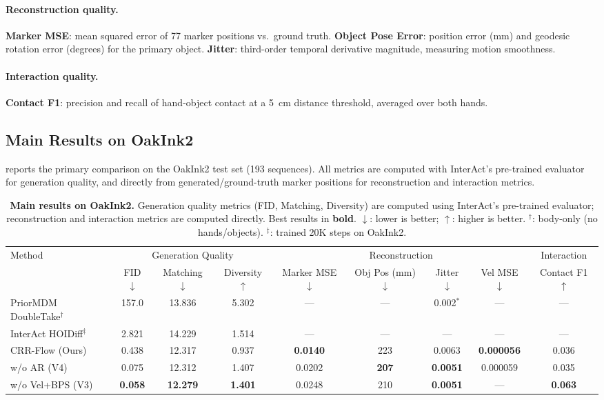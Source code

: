 \paragraph{Reconstruction quality.}
\textbf{Marker MSE}: mean squared error of 77 marker positions vs.\ ground truth.
\textbf{Object Pose Error}: position error (mm) and geodesic rotation error (degrees) for the primary object.
\textbf{Jitter}: third-order temporal derivative magnitude, measuring motion smoothness.

\paragraph{Interaction quality.}
\textbf{Contact F1}: precision and recall of hand-object contact at a 5~cm distance threshold, averaged over both hands.


\subsection{Main Results on OakInk2}
\label{sec:main_results}

 reports the primary comparison on the OakInk2 test set (193 sequences).
All metrics are computed with InterAct's pre-trained evaluator for generation quality, and directly from generated/ground-truth marker positions for reconstruction and interaction metrics.

\begin{table}[t]
  \caption{\textbf{Main results on OakInk2.} Generation quality metrics (FID, Matching, Diversity) are computed using InterAct's pre-trained evaluator; reconstruction and interaction metrics are computed directly. Best results in \textbf{bold}. $\downarrow$: lower is better; $\uparrow$: higher is better. $^\dagger$: body-only (no hands/objects). $^\ddagger$: trained 20K steps on OakInk2.}
  \label{tab:main_oakink2}
  \centering
  \small
  \begin{tabular}{@{}l|ccc|cccc|c@{}}
    \toprule
    \multirow{2}{*}{Method} & \multicolumn{3}{c|}{Generation Quality} & \multicolumn{4}{c|}{Reconstruction} & Interaction \\
    & FID $\downarrow$ & Matching $\downarrow$ & Diversity $\uparrow$ & Marker MSE $\downarrow$ & Obj Pos (mm) $\downarrow$ & Jitter $\downarrow$ & Vel MSE $\downarrow$ & Contact F1 $\uparrow$ \\
    \midrule
    PriorMDM DoubleTake$^\dagger$ & 157.0 & 13.836 & 5.302 & --- & --- & 0.002$^*$ & --- & --- \\
    InterAct HOIDiff$^\ddagger$ & 2.821 & 14.229 & 1.514 & --- & --- & --- & --- & --- \\
    \midrule
    CRR-Flow (Ours) & 0.438 & 12.317 & 0.937 & \textbf{0.0140} & 223 & 0.0063 & \textbf{0.000056} & 0.036 \\
    \quad w/o AR (V4) & 0.075 & 12.312 & 1.407 & 0.0202 & \textbf{207} & \textbf{0.0051} & 0.000059 & 0.035 \\
    \quad w/o Vel+BPS (V3) & \textbf{0.058} & \textbf{12.279} & \textbf{1.401} & 0.0248 & 210 & \textbf{0.0051} & --- & \textbf{0.063} \\
    \bottomrule
  \end{tabular}
\end{table}

